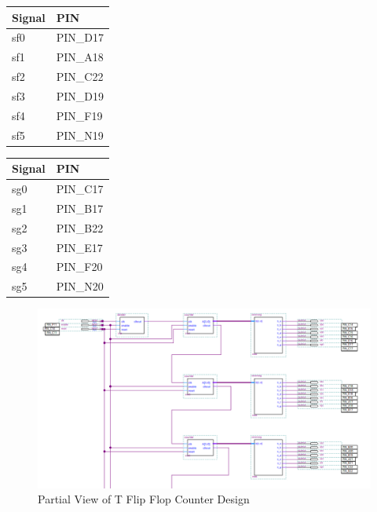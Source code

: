 \documentclass{article}
\begin{document}
\begin{table}[htbp]
  \centering
  \begin{minipage}[t]{0.5\textwidth}
    \centering
    \begin{tabular}{ll}
    \textbf{Signal} & \textbf{PIN} \\
    \hline
    sf0   & PIN\_D17 \\
    sf1   & PIN\_A18 \\
    sf2   & PIN\_C22 \\
    sf3   & PIN\_D19 \\
    sf4   & PIN\_F19 \\
    sf5   & PIN\_N19 \\
    \end{tabular}%
    \label{tab:pin_assignments7}%
  \end{minipage}\hfill
  \begin{minipage}[t]{0.5\textwidth}
    \centering
    \begin{tabular}{ll}
    \textbf{Signal} & \textbf{PIN} \\
    \hline
    sg0   & PIN\_C17 \\
    sg1   & PIN\_B17 \\
    sg2   & PIN\_B22 \\
    sg3   & PIN\_E17 \\
    sg4   & PIN\_F20 \\
    sg5   & PIN\_N20 \\
    \end{tabular}%
    \label{tab:pin_assignments8}%
  \end{minipage}
\end{table}

\begin{figure}[H]
  \centering
  \includegraphics*[width=1\linewidth]{full_counter.png}
  \caption{Partial View of T Flip Flop Counter Design}  
\end{figure}
\end{document}

